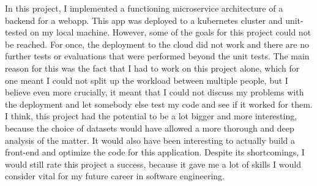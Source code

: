 \documentclass[11pt]{article}
\begin{document}
	In this project, I implemented a functioning microservice architecture of a backend for a webapp. This app was deployed to a kubernetes cluster and unit-tested on my local machine. However, some of the goals for this project could not be reached. For once, the deployment to the cloud did not work and there are no further tests or evaluations that were performed beyond the unit tests. The main reason for this was the fact that I had to work on this project alone, which for one meant I could not split up the workload between multiple people, but I believe even more crucially, it meant that I could not discuss my problems with the deployment and let somebody else test my code and see if it worked for them. I think, this project had the potential to be a lot bigger and more interesting, because the choice of datasets would have allowed a more thorough and deep analysis of the matter. It would also have been interesting to actually build a front-end and optimize the code for this application. Despite its shortcomings, I would still rate this project a success, because it gave me a lot of skills I would consider vital for my future career in software engineering.
	
	\newpage
	
	
	
	
	
\end{document}
